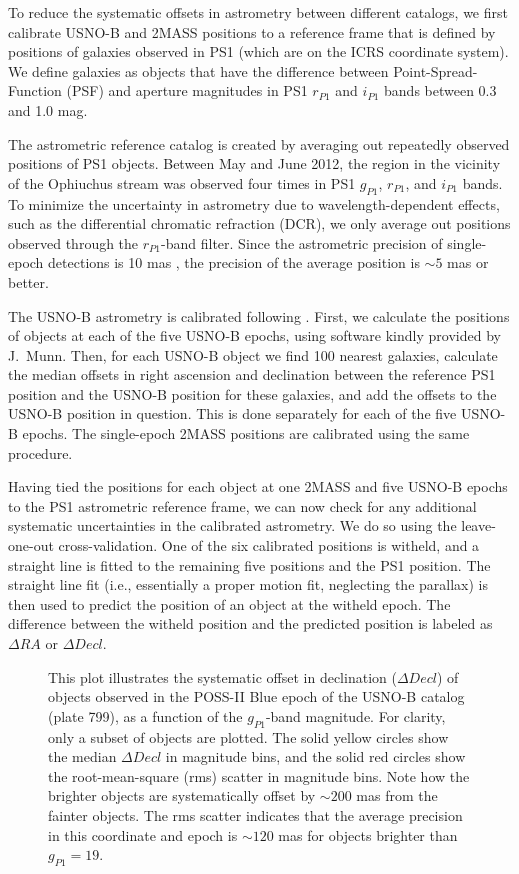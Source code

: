 \documentclass[iop]{emulateapj}
\begin{document}
To reduce the systematic offsets in astrometry between different catalogs, we
first calibrate USNO-B and 2MASS positions to a reference frame that is defined
by positions of galaxies observed in PS1 (which are on the ICRS coordinate
system). We define galaxies as objects that have the difference between
Point-Spread-Function (PSF) and aperture magnitudes in PS1 $r_{P1}$ and $i_{P1}$
bands between 0.3 and 1.0 mag.

The astrometric reference catalog is created by averaging out repeatedly
observed positions of PS1 objects. Between May and June 2012, the region in the
vicinity of the Ophiuchus stream was observed four times in PS1 $g_{P1}$,
$r_{P1}$, and $i_{P1}$ bands. To minimize the uncertainty in astrometry due to
wavelength-dependent effects, such as the differential chromatic refraction
(DCR), we only average out positions observed through the $r_{P1}$-band filter.
Since the astrometric precision of single-epoch detections is 10 mas
\citep{mag08}, the precision of the average position is $\sim5$ mas or better.

The USNO-B astrometry is calibrated following
\citet[see their Section 2.1]{mun04}. First, we calculate the positions
of objects at each of the five USNO-B epochs, using software kindly provided by
J.~Munn. Then, for each USNO-B object we find 100 nearest galaxies, calculate
the median offsets in right ascension and declination between the reference PS1
position and the USNO-B position for these galaxies, and add the offsets to the
USNO-B position in question. This is done separately for each of the five USNO-B
epochs. The single-epoch 2MASS positions are calibrated using the same
procedure.

Having tied the positions for each object at one 2MASS and five USNO-B epochs to
the PS1 astrometric reference frame, we can now check for any additional
systematic uncertainties in the calibrated astrometry. We do so using the
leave-one-out cross-validation. One of the six calibrated positions is witheld, 
and a straight line is fitted to the remaining five positions and the PS1
position. The straight line fit (i.e., essentially a proper motion fit,
neglecting the parallax) is then used to predict the position of an object at
the witheld epoch. The difference between the witheld position and the predicted
position is labeled as $\Delta RA$ or $\Delta Decl$.

\begin{figure}
\caption{
This plot illustrates the systematic offset in declination ($\Delta Decl$) of
objects observed in the POSS-II Blue epoch of the USNO-B catalog (plate 799), as
a function of the $g_{P1}$-band magnitude. For clarity, only a subset of objects
are plotted. The solid yellow circles show the median $\Delta Decl$ in magnitude
bins, and the solid red circles show the root-mean-square (rms) scatter in
magnitude bins. Note how the brighter objects are systematically offset by
$\sim200$ mas from the fainter objects. The rms scatter indicates that the
average precision in this coordinate and epoch is $\sim120$ mas for objects
brighter than $g_{P1}=19$.
\label{usnob_crossvalidation}}
\end{figure}
\end{document}
